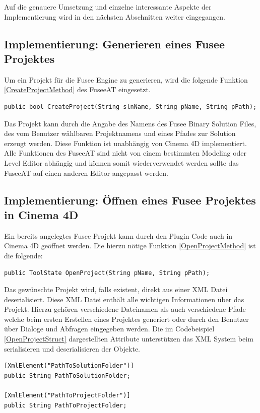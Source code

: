\documentclass[pagesize, paper=a4, fontsize=12pt, titlepage=true, headings=small, headnosepline, abstractoff, liststotoc, nochapterprefix, plainheadsepline, twoside]{scrreprt}
\begin{document}
Auf die genauere Umsetzung und einzelne interessante Aspekte der Implementierung wird in den nächsten Abschnitten weiter eingegangen.

\subsection{Implementierung: Generieren eines Fusee Projektes}
Um ein Projekt für die Fusee Engine zu generieren, wird die folgende Funktion \ref{CreateProjectMethod} des FuseeAT eingesetzt. 
\begin{lstlisting}[label=CreateProjectMethod, caption=Funktion zum Generieren eines neuen Projekts in der Binary Version der Fusee Engine.]
	public bool CreateProject(String slnName, String pName, String pPath);
\end{lstlisting}
Das Projekt kann durch die Angabe des Namens des Fusee Binary Solution Files, des vom Benutzer wählbaren Projektnamens und eines Pfades zur Solution erzeugt werden. Diese Funktion ist unabhängig von Cinema 4D implementiert. Alle Funktionen des FuseeAT sind nicht von einem bestimmten Modeling oder Level Editor abhängig und können somit wiederverwendet werden sollte das FuseeAT auf einen anderen Editor angepasst werden.

\subsection{Implementierung: Öffnen eines Fusee Projektes in Cinema 4D}
Ein bereits angelegtes Fusee Projekt kann durch den Plugin Code auch in Cinema 4D geöffnet werden. Die hierzu nötige Funktion \ref{OpenProjectMethod} ist die folgende:
\begin{lstlisting}[label=OpenProjectMethod, caption=Funktion zum öffnen eines neuen Projekts in der Binary Version der Fusee Engine.]
	public ToolState OpenProject(String pName, String pPath);
\end{lstlisting}
Das gewünschte Projekt wird, falls existent, direkt aus einer XML Datei deserialisiert. Diese XML Datei enthält alle wichtigen Informationen über das Projekt. Hierzu gehören verschiedene Dateinamen als auch verschiedene Pfade welche beim ersten Erstellen eines Projektes generiert oder durch den Benutzer über Dialoge und Abfragen eingegeben werden. Die im Codebeispiel \ref{OpenProjectStruct} dargestellten Attribute unterstützen das XML System beim serialisieren und deserialisieren der Objekte.

\begin{lstlisting}[label=OpenProjectStruct, caption=Teil des Structs zum Serialisieren des Fusee Projektes aus Cinem a 4D. Die Serialisierung speichert das Projekt auf der Festplatte als lesbare XML Datei.]
[XmlElement("PathToSolutionFolder")]
public String PathToSolutionFolder;

[XmlElement("PathToProjectFolder")]
public String PathToProjectFolder;
\end{lstlisting}
\end{document}
